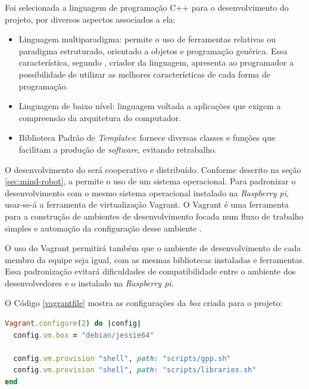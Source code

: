 \FloatBarrier
\par
Foi selecionada a linguagem de programação \textsf{C++} para o desenvolvimento
do projeto, por diversos aspectos associados a ela:
\begin{itemize}
  \item Linguagem multiparadigma: permite o uso de ferramentas relativas
  ou paradigma estruturado, orientado a objetos e programação genérica. Essa
  característica, segundo \cite{stroustrup2012}, criador da linguagem, apresenta
  ao programador a possibilidade de utilizar as melhores características de
  cada forma de programação.
  
  \item Linguagem de baixo nível: linguagem voltada a aplicações que exigem
  a compreensão da arquitetura do computador.
  
  \item Biblioteca Padrão de \textit{Templates}: fornece diversas classes e
  funções que facilitam a produção de \textit{software}, evitando retrabalho.
\end{itemize}
\par
O desenvolvimento do \software será cooperativo e distribuído. Conforme descrito na
seção \ref{sec:mind-robot}, a \rasp permite o uso de um sistema operacional. Para
padronizar o desenvolvimento com o mesmo sistema operacional instalado na
\textit{Raspberry pi}, usar-se-á a ferramenta de virtualização \textsf{Vagrant}.
O \textsf{Vagrant} é uma ferramenta para a construção de ambientes de desenvolvimento
focada num fluxo de trabalho simples e automação da configuração desse ambiente
\cite{hashicorp2016}.
\par
O uso do \textsf{Vagrant} permitirá também que o ambiente de desenvolvimento de
cada membro da equipe seja igual, com as mesmas bibliotecas instaladas e ferramentas.
Essa padronização evitará dificuldades de compatibilidade entre o ambiente dos
desenvolvedores e o instalado na \textit{Raspberry pi}.
\par
O Código \ref{vagrantfile} mostra as configurações da \textit{box} criada para o
projeto:
\par
\begin{lstlisting}[language=Ruby, label=vagrantfile, caption=\textsf{Vagrantfile} inicial]
Vagrant.configure(2) do |config|
  config.vm.box = "debian/jessie64"

  config.vm.provision "shell", path: "scripts/gpp.sh"
  config.vm.provision "shell", path: "scripts/libraries.sh"
end
\end{lstlisting}
